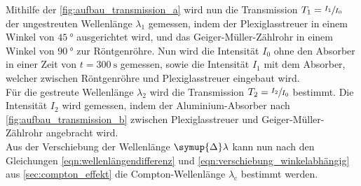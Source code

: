     Mithilfe der \autoref{fig:aufbau_transmission_a} wird nun die Transmission $T_1 = \sfrac{I_1}{I_0}$ der ungestreuten Wellenlänge $\lambda_1$ gemessen,
    indem der Plexiglasstreuer in einem Winkel von $\SI{45}{\degree}$ ausgerichtet wird,
    und das Geiger-Müller-Zählrohr in einem Winkel von $\SI{90}{\degree}$ zur Röntgenröhre.
    Nun wird die Intensität $I_0$ ohne den Absorber in einer Zeit von $t = \SI{300}{\second}$ gemessen,
    sowie die Intensität $I_1$ mit dem Absorber,
    welcher zwischen Röntgenröhre und Plexiglasstreuer eingebaut wird.\\
    Für die gestreute Wellenlänge $\lambda_2$ wird die Transmission $T_2 = \sfrac{I_2}{I_0}$ bestimmt.
    Die Intensität $I_2$ wird gemessen,
    indem der Aluminium-Absorber nach \autoref{fig:aufbau_transmission_b}
    zwischen Plexiglasstreuer und Geiger-Müller-Zählrohr angebracht wird.\\
    Aus der Verschiebung der Wellenlänge $\symup{\Delta}\lambda$ kann nun
    nach den Gleichungen \ref{eqn:wellenlängendifferenz} und \ref{eqn:verschiebung_winkelabhängig}
    aus \autoref{sec:compton_effekt} die Compton-Wellenlänge $\lambda_\text{c}$ bestimmt werden.

